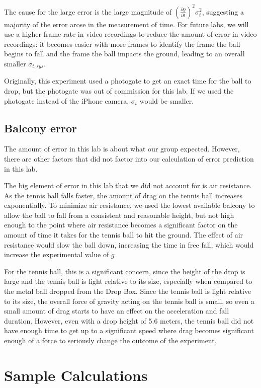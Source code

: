 \documentclass[12pt]{article}
\begin{document}
The cause for the large error is the large magnitude of \(\left(\frac{\partial g}{\partial t}\right)^{2}\sigma_{t}^2\), suggesting a majority of the error arose in the measurement of time. For future labs, we will use a higher frame rate in video recordings to reduce the amount of error in video recordings: it becomes easier with more frames to identify the frame the ball begins to fall and the frame the ball impacts the ground, leading to an overall smaller \(\sigma_{t,sys}\).

Originally, this experiment used a photogate to get an exact time for the ball to drop, but the photogate was out of commission for this lab. If we used the photogate instead of the iPhone camera, \(\sigma_t\) would be smaller.
\subsection{Balcony error}
\label{sec:orgaf9e176}

The amount of error in this lab is about what our group expected. However, there are other factors that did not factor into our calculation of error prediction in this lab.

The big element of error in this lab that we did not account for is air resistance. As the tennis ball falls faster, the amount of drag on the tennis ball increases exponentially. To minimize air resistance, we used the lowest available balcony to allow the ball to fall from a consistent and reasonable height, but not high enough to the point where air resistance becomes a significant factor on the amount of time it takes for the tennis ball to hit the ground. The effect of air resistance would slow the ball down, increasing the time in free fall, which would increase the experimental value of \(g\)

For the tennis ball, this is a significant concern, since the height of the drop is large and the tennis ball is light relative to its size, especially when compared to the metal ball dropped from the Drop Box. Since the tennis ball is light relative to its size, the overall force of gravity acting on the tennis ball is small, so even a small amount of drag starts to have an effect on the acceleration and fall duration. However, even with a drop height of 5.6 meters, the tennis ball did not have enough time to get up to a significant speed where drag becomes significant enough of a force to seriously change the outcome of the experiment.
\section{Sample Calculations}
\label{sec:orgb2a8a22}
\end{document}
